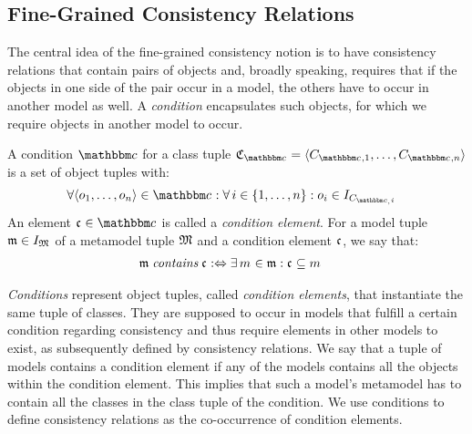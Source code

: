 \subsection{Fine-Grained Consistency Relations}
\label{chap:correctness:finegrained:relations}

The central idea of the fine-grained consistency notion is to have consistency relations that contain pairs of objects and, broadly speaking, requires that if the objects in one side of the pair occur in a model, the others have to occur in another model as well.
A \emph{condition} encapsulates such objects, for which we require objects in another model to occur.

\begin{definition}[Condition]
    A condition $\condition{c}{}$ for a class tuple $\classtuple{C}{\condition{c}{}} = \tupled{\class{C}{\condition{c}{},1}, \dots, \class{C}{\condition{c}{},n}}$ is a set of object tuples with: 
    \begin{align*}
    &
    \forall \tupled{\object{o}{1}, \dots, \object{o}{n}} \in \condition{c}{}: \forall i \in \setted{1, \dots, n} : \object{o}{i} \in \instances{\class{C}{\condition{c}, i}}
    \end{align*}
    An element $\conditionelement{c}{} \in \condition{c}{}$ is called a \emph{condition element}.
    For a model tuple $\modeltuple{m} \in \metamodeltupleinstanceset{M}$ of a metamodel tuple $\metamodeltuple{M}$ and a condition element $\conditionelement{c}{}$, we say that: 
    \begin{align*}
        &
        \modeltuple{m} \containsmath \conditionelement{c}{} \equivalentperdefinition
        \exists \model{m}{} \in \modeltuple{m} : \conditionelement{c}{} \subseteq \model{m}{}
    \end{align*}
\end{definition}

\emph{Conditions} represent object tuples, called \emph{condition elements}, that instantiate the same tuple of classes. 
They are supposed to occur in models that fulfill a certain condition regarding consistency and thus require elements in other models to exist, as subsequently defined by consistency relations.
We say that a tuple of models contains a condition element if any of the models contains all the objects within the condition element.
This implies that such a model's metamodel has to contain all the classes in the class tuple of the condition.
We use conditions to define consistency relations as the co-occurrence of condition elements.

